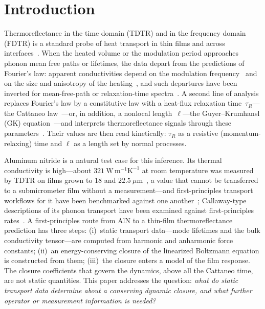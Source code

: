 \section{Introduction}\label{sec:intro}

Thermoreflectance in the time domain (TDTR) and in the frequency domain (FDTR) is a standard probe of
heat transport in thin films and across interfaces~\cite{Cahill2004,Schmidt2009}. When the heated volume or the
modulation period approaches phonon mean free paths or lifetimes, the data depart from the predictions
of Fourier's law: apparent conductivities depend on the modulation frequency~\cite{KohCahill2007,Regner2013}
and on the size and anisotropy of the heating~\cite{WilsonCahill2014}, and such departures have been
inverted for mean-free-path or relaxation-time spectra~\cite{Minnich2012,Forghani2016,Chen2025}. A second line
of analysis replaces Fourier's law by a constitutive law with a heat-flux relaxation
time~$\tau_R$---the Cattaneo law~\cite{JosephPreziosi1989}---or, in addition, a nonlocal
length~$\ell$---the Guyer--Krumhansl (GK) equation~\cite{GuyerKrumhansl1966a,GuyerKrumhansl1966b,GuoWang2015}---and
interprets thermoreflectance signals through these
parameters~\cite{Beardo2020,HennessyMyers2021,CamachoDeLaRosa2025}. Their values are then read
kinetically: $\tau_R$ as a resistive (momentum-relaxing) time and $\ell$ as a length set by normal
processes.

Aluminum nitride is a natural test case for this inference. Its thermal conductivity is high---about
$321~\mathrm{W\,m^{-1}K^{-1}}$ at room temperature was measured by TDTR on films grown to $18$ and
$22.5~\mu\mathrm{m}$~\cite{Cheng2020}, a value that cannot be transferred to a submicrometer film without
a measurement---and first-principles transport workflows for it have been benchmarked against one
another~\cite{McGaughey2025}; Callaway-type descriptions of its phonon transport have been examined
against first-principles rates~\cite{MaLiLuo2014}. A first-principles route from AlN to a
thin-film thermoreflectance prediction has three steps: (i)~static transport data---mode lifetimes
and the bulk conductivity tensor---are computed from harmonic and anharmonic force constants;
(ii)~an energy-conserving closure of the linearized Boltzmann equation is constructed from them;
(iii)~the closure enters a model of the film response. The closure coefficients that govern the
dynamics, above all the Cattaneo time, are not static quantities. This paper addresses the question:
\emph{what do static transport data determine about a conserving dynamic closure, and what further
operator or measurement information is needed?}

